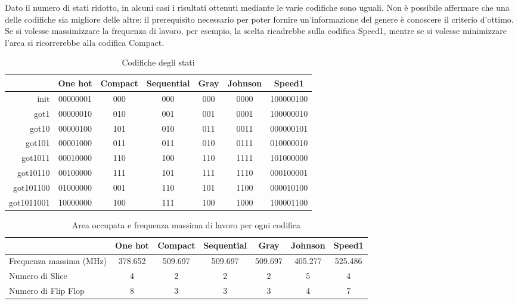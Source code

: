 Dato il numero di stati ridotto, in alcuni casi i risultati ottenuti mediante le varie codifiche sono uguali. Non è possibile affermare che una delle codifiche sia migliore delle altre: il prerequisito necessario per poter fornire un'informazione del genere è conoscere il criterio d'ottimo. Se si volesse massimizzare la frequenza di lavoro, per esempio, la scelta ricadrebbe sulla codifica Speed1, mentre se si volesse minimizzare l'area si ricorrerebbe alla codifica Compact.
\begin{table}
\begin{centering}
\begin{tabular}{|r|c|c|c|c|c|c|}
\hline
& One hot & Compact & Sequential & Gray & Johnson & Speed1\\
\hline
init & 00000001 & 000 & 000 & 000 & 0000 & 100000100 \\
\hline
got1 & 00000010 & 010 & 001 & 001 & 0001 & 100000010 \\
\hline
got10 & 00000100 & 101 & 010 & 011 & 0011 & 000000101 \\
\hline
got101 & 00001000 & 011 & 011 & 010 & 0111 & 010000010 \\
\hline
got1011 & 00010000 & 110 & 100 & 110 & 1111 & 101000000 \\
\hline
got10110 & 00100000 & 111 & 101 & 111 & 1110 & 000100001 \\
\hline
got101100 & 01000000 & 001 & 110 & 101 & 1100 & 000010100 \\
\hline
got1011001 & 10000000 & 100 & 111 & 100 & 1000 & 100001100 \\
\hline

\end{tabular}
\caption{\label{tab:codifiche}Codifiche degli stati}
\par\end{centering}
\end{table}

\begin{table}
\begin{centering}
\begin{tabular}{|l|c|c|c|c|c|c|}
\hline
& One hot & Compact & Sequential & Gray & Johnson & Speed1\\
\hline
Frequenza massima (MHz) & 378.652 & 509.697 & 509.697 & 509.697 & 405.277 & 525.486\\
\hline
Numero di Slice & 4 & 2 & 2 & 2 & 5 & 4 \\
\hline
Numero di Flip Flop & 8 & 3 & 3 & 3 & 4 & 7 \\
\hline
\end{tabular}
\caption{\label{tab:areafrequenza}Area occupata e frequenza massima di lavoro per ogni codifica}
\par\end{centering}
\end{table}

